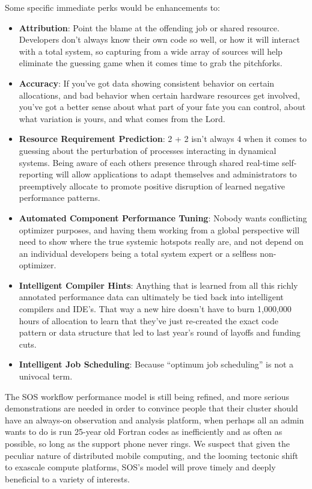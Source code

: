 Some specific immediate perks would be enhancements to:
\begin{itemize}
\item \textbf{Attribution}: Point the blame at the offending job or shared
  resource. Developers don't always know their own code so well,
  or how it will interact with a total system, so capturing from a
  wide array of sources will help eliminate the guessing game when it
  comes time to grab the pitchforks.
\item \textbf{Accuracy}: If you've got data showing consistent behavior on
      certain allocations, and bad behavior when certain hardware resources
      get involved, you've got a better sense about what part of your
      fate you can control, about what variation is yours, and what comes
      from the Lord.
\item \textbf{Resource Requirement Prediction}: 2 + 2 isn't always 4 when it
      comes to guessing about the perturbation of processes interacting in
      dynamical systems. Being aware of each others presence through shared
      real-time self-reporting will allow applications to adapt themselves
      and administrators to preemptively allocate to promote positive
      disruption of learned negative performance patterns.
\item \textbf{Automated Component Performance Tuning}: Nobody wants conflicting
  optimizer purposes, and having them working from a global perspective will
  need to show where the true systemic hotspots really are, and not depend on
  an individual developers being a total system expert or a selfless non-optimizer.
\item \textbf{Intelligent Compiler Hints}: Anything that is learned from all
      this richly annotated performance data can ultimately be tied back
      into intelligent compilers and IDE's. That way a new hire doesn't have
      to burn 1,000,000 hours of allocation to learn that they've just
      re-created the exact code pattern or data structure that led to last
      year's round of layoffs and funding cuts.
\item \textbf{Intelligent Job Scheduling}: Because ``optimum job scheduling''
      is not a univocal term.
\end{itemize}

    The SOS workflow performance model is still being refined, and
more serious demonstrations are needed in order to convince people
that their cluster should have an always-on observation and analysis
platform, when perhaps all an admin wants to do is run 25-year old
Fortran codes as inefficiently and as often as possible, so long as
the support phone never rings. We suspect that given the peculiar
nature of distributed mobile computing, and the looming tectonic shift
to exascale compute platforms, SOS's model will prove timely and
deeply beneficial to a variety of interests.

